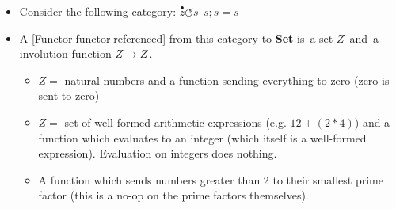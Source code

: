 
\begin{itemize}
    \item Consider the following category: $\boxed{\overset{\bullet}{z}\circlearrowleft s\ \ \boxed{s;s = s}}$
    \item A \ref{Functor|functor|referenced} from this category to \textbf{Set} is \,a set $Z$\, and \,a involution function $Z \rightarrow Z$\,.
          \begin{itemize}
            \item $Z =$ natural numbers and a function sending everything to zero (zero is sent to zero)
            \item $Z =$ set of well-formed arithmetic expressions (e.g. $12+(2*4)$) and a function which evaluates to an integer (which itself is a well-formed expression). Evaluation on integers does nothing.
            \item A function which sends numbers greater than 2 to their smallest prime factor (this is a no-op on the prime factors themselves).
          \end{itemize}
  \end{itemize}
